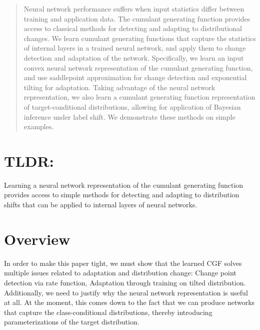 \documentclass{article}      %
\begin{document}
\printAffiliationsAndNotice{}



\begin{abstract}
  Neural network performance suffers when input statistics differ between training and application data.
  The cumulant generating function provides access to classical methods for detecting and adapting to distributional changes.
  We learn cumulant generating functions that capture the statistics of internal layers in a trained neural network, and apply them to change detection and adaptation of the network.
  Specifically, we learn an input convex neural network representation of the cumulant generating function, and use saddlepoint approximation for change detection and exponential tilting for adaptation.
  Taking advantage of the neural network representation, we also learn a cumulant generating function representation of target-conditional distributions, allowing for application of Bayesian inference under label shift.
  We demonstrate these methods on simple examples.
\end{abstract}




\section{TLDR:}
Learning a neural network representation of the cumulant generating function provides access to simple methods for detecting and adapting to distribution shifts that can be applied to internal layers of neural networks.



\section{Overview}

In order to make this paper tight, we must show that the learned CGF solves multiple issues related to adaptation and distribution change: Change point detection via rate function, Adaptation through training on tilted distribution.
Additionally, we need to justify why the neural network representation is useful at all.
At the moment, this comes down to the fact that we can produce networks that capture the class-conditional distributions, thereby introducing parameterizations of the target distribution.
\end{document}

